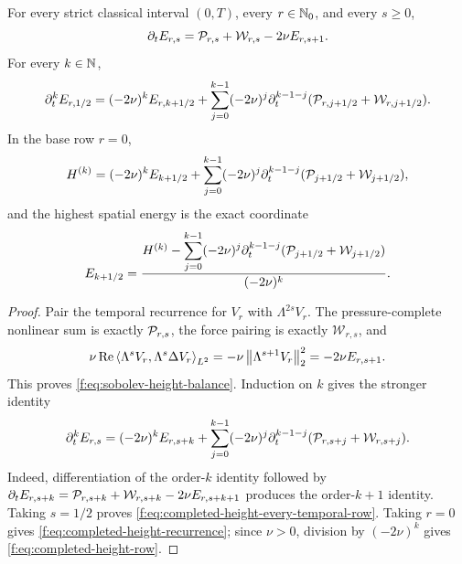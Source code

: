 \begin{proposition}
\label{f:prop:completed-height-recurrence}
For every strict classical interval \((0,T)\), every \(r\in\mathbb N_0\), and
every \(s\ge0\),
\begin{equation}
 \partial_tE_{r,s}=\mathcal P_{r,s}+\mathcal W_{r,s}-2\nu E_{r,s+1}.
 \label{f:eq:sobolev-height-balance}
\end{equation}
For every \(k\in\mathbb N\),
\begin{equation}
 \partial_t^kE_{r,1/2}
 =(-2\nu)^kE_{r,k+1/2}
 +\sum_{j=0}^{k-1}(-2\nu)^j
   \partial_t^{k-1-j}
   (\mathcal P_{r,j+1/2}+\mathcal W_{r,j+1/2}).
 \label{f:eq:completed-height-every-temporal-row}
\end{equation}
In the base row \(r=0\),
\begin{equation}
 H^{(k)}
 =(-2\nu)^kE_{k+1/2}
 +\sum_{j=0}^{k-1}(-2\nu)^j
   \partial_t^{k-1-j}(\mathcal P_{j+1/2}+\mathcal W_{j+1/2}),
 \label{f:eq:completed-height-recurrence}
\end{equation}
and the highest spatial energy is the exact coordinate
\begin{equation}
 E_{k+1/2}
 =\frac{H^{(k)}-
   \displaystyle\sum_{j=0}^{k-1}(-2\nu)^j
   \partial_t^{k-1-j}(\mathcal P_{j+1/2}+\mathcal W_{j+1/2})}
 {(-2\nu)^k}.
 \label{f:eq:completed-height-row}
\end{equation}
\end{proposition}

\begin{proof}
Pair the temporal recurrence for \(V_r\) with \(\Lambda^{2s}V_r\).
The pressure-complete nonlinear sum is exactly \(\mathcal P_{r,s}\), the force
pairing is exactly \(\mathcal W_{r,s}\), and
\[
 \nu\operatorname{Re}\left\langle \Lambda^sV_r,\Lambda^s\Delta V_r\right\rangle_{L^2}
 =-\nu\left\lVert \Lambda^{s+1}V_r\right\rVert_2^2=-2\nu E_{r,s+1}.
\]
This proves \eqref{f:eq:sobolev-height-balance}.  Induction on \(k\) gives
the stronger identity
\begin{equation}
 \partial_t^kE_{r,s}
 =(-2\nu)^kE_{r,s+k}
 +\sum_{j=0}^{k-1}(-2\nu)^j
   \partial_t^{k-1-j}(\mathcal P_{r,s+j}+\mathcal W_{r,s+j}).
 \label{f:eq:all-height-recurrence}
\end{equation}
Indeed, differentiation of the order-\(k\) identity followed by
\(\partial_tE_{r,s+k}=\mathcal P_{r,s+k}+\mathcal W_{r,s+k}
-2\nu E_{r,s+k+1}\) produces the
order-\(k+1\) identity.  Taking \(s=1/2\) proves
\eqref{f:eq:completed-height-every-temporal-row}.  Taking \(r=0\) gives
\eqref{f:eq:completed-height-recurrence}; since \(\nu>0\), division by
\((-2\nu)^k\) gives \eqref{f:eq:completed-height-row}.
\end{proof}

